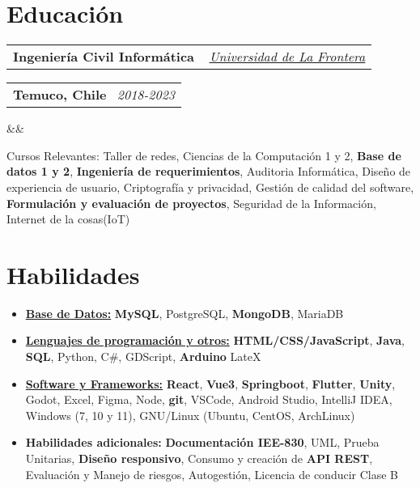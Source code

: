 \documentclass[11pt,a4paper,sans]{moderncv}
\makeatletter
\newcommand{\sectionMargin}{-3mm}
\newcommand*{\customcventry}[7][.13em]{
    \begin{tabular}{@{}l}
    {\bfseries #4} \
    {\itshape #3}
    \end{tabular}
    \hfill
    \begin{tabular}{l@{}}
    {\bfseries #5} \
    {\itshape #2}
    \end{tabular}
    \ifx&#7&%
    \else{\
    \begin{minipage}{\maincolumnwidth}%
    \small#7%
    \end{minipage}}\fi%
    \par\addvspace{#1}
}
\makeatother
\begin{document}
\section{Educación}{
    \customcventry
        {2018-2023}
        { \href{https://1drv.ms/b/c/13c8ae619d64655e/EV5lZJ1hrsgggBOHLAAAAAABHh9OZUbWLd2nx7PTa_OSsg?e=Fedmge}
        {\underline{Universidad de La Frontera}} }
        {Ingeniería Civil Informática}
        {Temuco, Chile}{}{}
        {Cursos Relevantes: 
            Taller de redes, 
            Ciencias de la Computación 1 y 2, 
            \textbf{Base de datos 1 y 2}, 
            \textbf{Ingeniería de requerimientos},
            Auditoria Informática, 
            Diseño de experiencia de usuario, 
            Criptografía y privacidad, 
            Gestión de calidad del software, 
            \textbf{Formulación y evaluación de proyectos},
            Seguridad de la Información,
            Internet de la cosas(IoT)
    }
}

\vspace*{\sectionMargin}

\section{Habilidades}{
    \begin{itemize}[label=\textbullet]
        \item {\underline{\textbf{Base de Datos:}}
            \textbf{MySQL},
            PostgreSQL,
            \textbf{MongoDB},
            MariaDB
        }
        \item {\underline{\textbf{Lenguajes de programación y otros:}}
            \textbf{HTML/CSS/JavaScript},
            \textbf{Java},
            \textbf{SQL},
            Python,
            C\#,
            GDScript,
            \textbf{Arduino}
            LateX
        }
        \item {\underline{\textbf{Software y Frameworks:}}
            \textbf{React},
            \textbf{Vue3},
            \textbf{Springboot},
            \textbf{Flutter},
            \textbf{Unity},
            Godot,
            Excel, 
            Figma,
            Node,
            \textbf{git},
            VSCode,
            Android Studio,
            IntelliJ IDEA,
            Windows (7, 10 y 11),
            GNU/Linux (Ubuntu, CentOS, ArchLinux)
        }
        \item {\textbf{Habilidades adicionales:} 
            \textbf{Documentación IEE-830},
            UML,
            Prueba Unitarias,
            \textbf{Diseño responsivo},
            Consumo y creación de \textbf{API REST},
            Evaluación y Manejo de riesgos,  
            Autogestión, 
            Licencia de conducir Clase B
        }
    \end{itemize}
}
\end{document}
